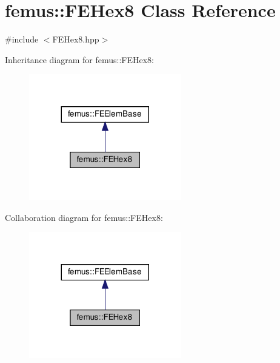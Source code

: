 \hypertarget{classfemus_1_1_f_e_hex8}{}\section{femus\+:\+:F\+E\+Hex8 Class Reference}
\label{classfemus_1_1_f_e_hex8}


{\ttfamily \#include $<$F\+E\+Hex8.\+hpp$>$}



Inheritance diagram for femus\+:\+:F\+E\+Hex8\+:
\nopagebreak
\begin{figure}[H]
\begin{center}
\leavevmode
\includegraphics[width=188pt]{classfemus_1_1_f_e_hex8__inherit__graph}
\end{center}
\end{figure}


Collaboration diagram for femus\+:\+:F\+E\+Hex8\+:
\nopagebreak
\begin{figure}[H]
\begin{center}
\leavevmode
\includegraphics[width=188pt]{classfemus_1_1_f_e_hex8__coll__graph}
\end{center}
\end{figure}

